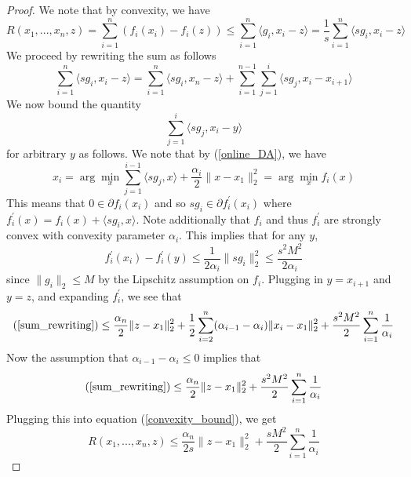  \begin{proof}
  We note that by convexity, we have
  \begin{equation}\label{convexity_bound}
   R(x_1,...,x_n,z) = \displaystyle\sum_{i = 1}^n (f_i(x_i) - f_i(z)) \leq \displaystyle\sum_{i = 1}^n\langle g_i, x_i - z\rangle
   = \frac{1}{s}\displaystyle\sum_{i = 1}^n\langle sg_i, x_i - z\rangle
  \end{equation}
  We proceed by rewriting the sum as follows
  \begin{equation}\label{sum_rewriting}
   \displaystyle\sum_{i = 1}^n\langle sg_i, x_i - z\rangle = \displaystyle\sum_{i = 1}^n\langle sg_i, x_n - z\rangle + 
   \displaystyle\sum_{i = 1}^{n-1} \displaystyle\sum_{j = 1}^i \langle sg_j, x_i - x_{i+1}\rangle
  \end{equation}
  We now bound the quantity
  \begin{equation}
   \displaystyle\sum_{j = 1}^i \langle sg_j, x_i - y\rangle
  \end{equation}
  for arbitrary $y$ as follows. We note that by (\ref{online_DA}), we have
  \begin{equation}
   x_i = \arg\min_x \displaystyle\sum_{j = 1}^{i-1} \langle sg_j, x\rangle + \frac{\alpha_i}{2}\|x - x_1\|_2^2 = \arg\min_x f_i(x)
  \end{equation}
  This means that $0\in \partial f_i(x_i)$ and so $sg_i\in \partial f_i^\prime(x_i)$ where 
  $f_i^\prime(x) = f_i(x) + \langle sg_i, x\rangle$. Note additionally that $f_i$ and thus $f_i^\prime$ are strongly
  convex with convexity parameter $\alpha_i$. This implies that for any $y$,
  \begin{equation}
   f_i^\prime(x_i) - f_i^\prime(y) \leq \frac{1}{2\alpha_i}\|sg_i\|_2^2 \leq \frac{s^2M^2}{2\alpha_i}
  \end{equation}
  since $\|g_i\|_2\leq M$ by the Lipschitz assumption on $f_i$. Plugging in $y = x_{i+1}$ and $y = z$, and
  expanding $f_i^\prime$, we see that
  \begin{equation}
   (\ref{sum_rewriting})\leq \frac{\alpha_n}{2} \|z - x_1\|_2^2 
   + \frac{1}{2}\displaystyle\sum_{i = 2}^n (\alpha_{i-1} - \alpha_i)\|x_i - x_1\|_2^2 + \frac{s^2M^2}{2}\displaystyle\sum_{i = 1}^n \frac{1}{\alpha_i}
  \end{equation}
  Now the assumption that $\alpha_{i-1} - \alpha_i\leq 0$ implies that
  \begin{equation}
   (\ref{sum_rewriting})\leq \frac{\alpha_n}{2} \|z - x_1\|_2^2 + \frac{s^2M^2}{2}\displaystyle\sum_{i = 1}^n \frac{1}{\alpha_i}
  \end{equation}
  Plugging this into equation (\ref{convexity_bound}), we get
  \begin{equation}
   R(x_1,...,x_n,z) \leq \frac{\alpha_n}{2s} \|z - x_1\|_2^2 + \frac{sM^2}{2}\displaystyle\sum_{i = 1}^n \frac{1}{\alpha_i}
  \end{equation}


 \end{proof}

